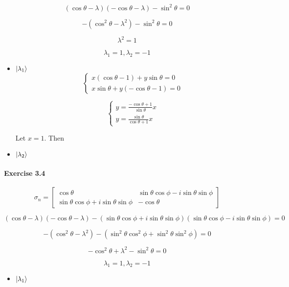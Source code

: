\documentclass[a4paper]{article}
\begin{document}
$$
    (\cos\theta - \lambda) (-\cos\theta - \lambda) - \sin^{2}\theta = 0
$$

$$
    -(\cos^{2}\theta - \lambda^{2}) - \sin^{2}\theta = 0
$$

$$
    \lambda^{2} = 1
$$

$$
    \lambda_{1} = 1, \lambda_{2} = -1
$$

\begin{itemize}
    \item $\ket{\lambda_{1}}$
        $$
            \begin{cases}
                x (\cos\theta - 1) + y \sin\theta = 0 \\
                x \sin\theta + y (-\cos\theta - 1) = 0
            \end{cases}
        $$

        $$
            \begin{cases}
                y = \frac{-\cos\theta + 1}{\sin\theta} x \\
                y = \frac{\sin\theta}{\cos\theta + 1} x
            \end{cases}
        $$

        Let $x = 1$. Then
    \item $\ket{\lambda_{2}}$
\end{itemize}

\paragraph{Exercise 3.4}

$$
    \sigma_{n} =
        \begin{bmatrix}
            \cos\theta & \sin\theta \cos\phi - i \sin\theta \sin\phi \\
            \sin\theta \cos\phi + i \sin\theta \sin\phi & - \cos\theta
        \end{bmatrix}
$$

$$
    (\cos\theta - \lambda) (- \cos\theta - \lambda) - (\sin\theta \cos\phi + i \sin\theta \sin\phi) (\sin\theta \cos\phi - i \sin\theta \sin\phi) = 0
$$

$$
    - (\cos^{2}\theta - \lambda^{2}) - (\sin^{2}\theta \cos^{2}\phi + \sin^{2}\theta \sin^{2}\phi) = 0
$$

$$
    - \cos^{2}\theta + \lambda^{2} - \sin^{2}\theta = 0
$$

$$
    \lambda_{1} = 1, \lambda_{2} = -1
$$

\begin{itemize}
    \item $\ket{\lambda_{1}}$
\end{itemize}
\end{document}
